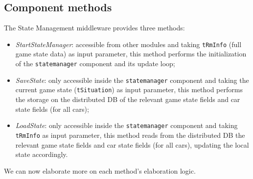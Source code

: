 \subsection{Component methods}
The State Management middleware provides three methods:
\begin{itemize}
	\item \textit{StartStateManager}: accessible from other modules and taking \texttt{tRmInfo} (full game state data) as input parameter, this method performs the initialization of the \texttt{statemanager} component and its update loop;
	\item \textit{SaveState}: only accessible inside the \texttt{statemanager} component and taking the current game state (\texttt{tSituation}) as input parameter, this method performs the storage on the distributed DB of the relevant game state fields and car state fields (for all cars);
	\item \textit{LoadState}: only accessible inside the \texttt{statemanager} component and taking \texttt{tRmInfo} as input parameter, this method reads from the distributed DB the relevant game state fields and car state fields (for all cars), updating the local state accordingly.
\end{itemize}
We can now elaborate more on each method's elaboration logic.


